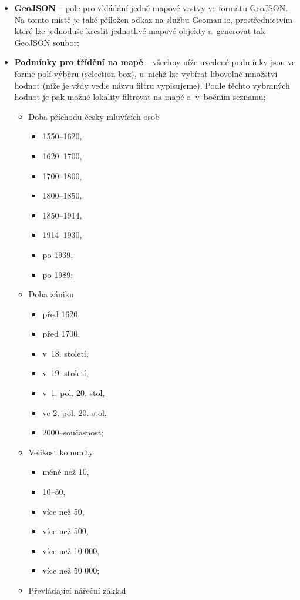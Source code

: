 \begin{itemize}
\tightlist
\item
  \textbf{GeoJSON} -- pole pro vkládání jedné mapové vrstvy ve formátu GeoJSON. Na tomto místě je také příložen odkaz na službu Geoman.io, prostřednictvím které lze jednoduše kreslit jednotlivé mapové objekty a~generovat tak GeoJSON soubor;
\item
  \textbf{Podmínky pro třídění na mapě} -- všechny níže uvedené podmínky jsou ve formě polí výběru (selection box), u~nichž lze vybírat libovolné množství hodnot (níže je vždy vedle názvu filtru vypisujeme). Podle těchto vybraných hodnot je pak možné lokality filtrovat na mapě a~v~bočním seznamu;

  \begin{itemize}
  \tightlist
  \item
    Doba příchodu česky mluvících osob

    \begin{itemize}
    \tightlist
    \item
      1550--1620,
    \item
      1620--1700,
    \item
      1700--1800,
    \item
      1800--1850,
    \item
      1850--1914,
    \item
      1914--1930,
    \item
      po 1939,
    \item
      po 1989;
    \end{itemize}
  \item
    Doba zániku

    \begin{itemize}
    \tightlist
    \item
      před 1620,
    \item
      před 1700,
    \item
      v~18. století,
    \item
      v~19. století,
    \item
      v~1. pol. 20. stol,
    \item
      ve 2. pol. 20. stol,
    \item
      2000--současnost;
    \end{itemize}
  \item
    Velikost komunity

    \begin{itemize}
    \tightlist
    \item
      méně než 10,
    \item
      10--50,
    \item
      více než 50,
    \item
      více než 500,
    \item
      více než 10 000,
    \item
      více než 50 000;
    \end{itemize}
  \item
    Převládající nářeční základ


\end{itemize}
\end{itemize}
